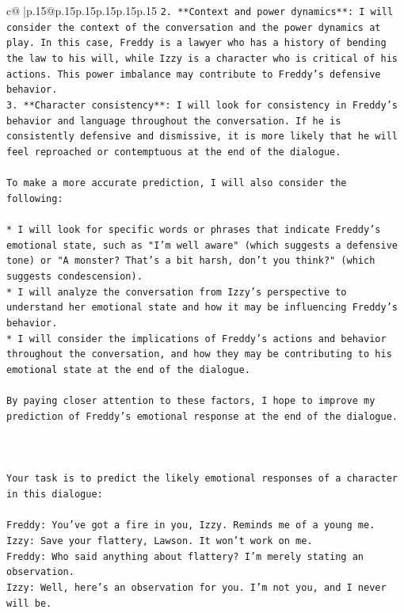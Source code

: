 \documentclass{article}
\begin{document}
{\begin{supertabular}{c@{$\;$}|p{.15\linewidth}@{}p{.15\linewidth}p{.15\linewidth}p{.15\linewidth}p{.15\linewidth}p{.15\linewidth}}
{{{\texttt{2. **Context and power dynamics**: I will consider the context of the conversation and the power dynamics at play. In this case, Freddy is a lawyer who has a history of bending the law to his will, while Izzy is a character who is critical of his actions. This power imbalance may contribute to Freddy's defensive behavior.} \\
\texttt{3. **Character consistency**: I will look for consistency in Freddy's behavior and language throughout the conversation. If he is consistently defensive and dismissive, it is more likely that he will feel reproached or contemptuous at the end of the dialogue.} \\
\\ 
\texttt{To make a more accurate prediction, I will also consider the following:} \\
\\ 
\texttt{* I will look for specific words or phrases that indicate Freddy's emotional state, such as "I'm well aware" (which suggests a defensive tone) or "A monster? That's a bit harsh, don't you think?" (which suggests condescension).} \\
\texttt{* I will analyze the conversation from Izzy's perspective to understand her emotional state and how it may be influencing Freddy's behavior.} \\
\texttt{* I will consider the implications of Freddy's actions and behavior throughout the conversation, and how they may be contributing to his emotional state at the end of the dialogue.} \\
\\ 
\texttt{By paying closer attention to these factors, I hope to improve my prediction of Freddy's emotional response at the end of the dialogue.} \\
\\ 
\\ 
\\ 
\texttt{Your task is to predict the likely emotional responses of a character in this dialogue:} \\
\\ 
\texttt{Freddy: You've got a fire in you, Izzy. Reminds me of a young me.} \\
\texttt{Izzy: Save your flattery, Lawson. It won't work on me.} \\
\texttt{Freddy: Who said anything about flattery? I'm merely stating an observation.} \\
\texttt{Izzy: Well, here's an observation for you. I'm not you, and I never will be.} \\
}}}
\end{supertabular}}
\end{document}
